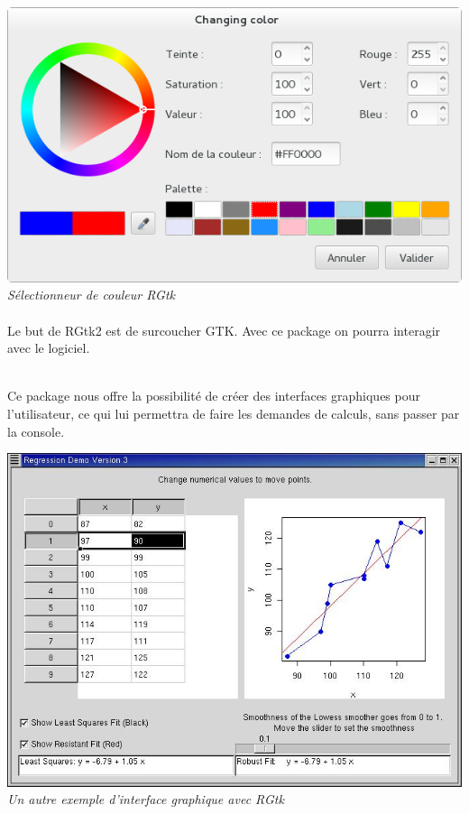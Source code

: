 \begin{center}
\includegraphics[scale=0.4]{colorselector2.png}\\
\textit{Sélectionneur de couleur RGtk}
\end{center}

\paragraph{}
Le but de RGtk2 est de surcoucher GTK. Avec ce package on pourra interagir avec le logiciel. \\\\\indent

Ce package nous offre la possibilité de créer
des interfaces graphiques pour l’utilisateur, ce qui lui permettra de faire les
demandes de calculs, sans passer par la console.\\

\begin{center}
\includegraphics[scale=0.4]{regression.jpg}\\
\textit{Un autre exemple d'interface graphique avec RGtk}
\end{center}